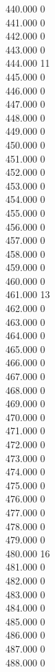 { 440.000	0 \\
 441.000	0 \\
 442.000	0 \\
 443.000	0 \\
 444.000	11 \\
 445.000	0 \\
 446.000	0 \\
 447.000	0 \\
 448.000	0 \\
 449.000	0 \\
 450.000	0 \\
 451.000	0 \\
 452.000	0 \\
 453.000	0 \\
 454.000	0 \\
 455.000	0 \\
 456.000	0 \\
 457.000	0 \\
 458.000	0 \\
 459.000	0 \\
 460.000	0 \\
 461.000	13 \\
 462.000	0 \\
 463.000	0 \\
 464.000	0 \\
 465.000	0 \\
 466.000	0 \\
 467.000	0 \\
 468.000	0 \\
 469.000	0 \\
 470.000	0 \\
 471.000	0 \\
 472.000	0 \\
 473.000	0 \\
 474.000	0 \\
 475.000	0 \\
 476.000	0 \\
 477.000	0 \\
 478.000	0 \\
 479.000	0 \\
 480.000	16 \\
 481.000	0 \\
 482.000	0 \\
 483.000	0 \\
 484.000	0 \\
 485.000	0 \\
 486.000	0 \\
 487.000	0 \\
 488.000	0 \\
}
